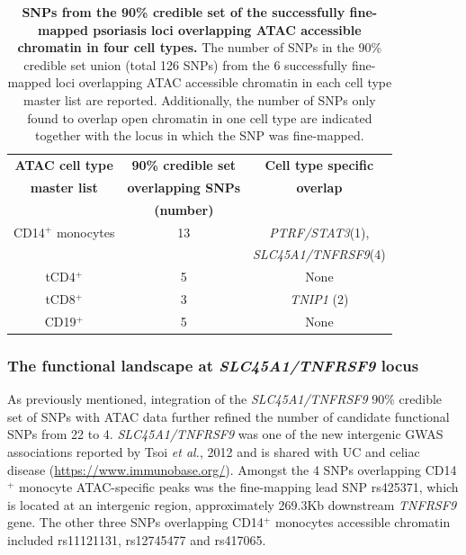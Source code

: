 \begin{table}[htbp]
\centering
\begin{tabular}{@{} c c c}
\toprule
\textbf{ATAC cell type} & \textbf{90\% credible set}   &  \textbf{Cell type specific}  \\
\textbf{master list}    & \textbf{overlapping SNPs}    &   \textbf{overlap}   \\
									      &	\textbf{(number)}				     &                            \\
\midrule
\midrule
 CD14$^+$ monocytes    & 13                            &  \textit{PTRF/STAT3}(1),\\ 
                       &                               &  \textit{SLC45A1/TNFRSF9}(4)\\
 tCD4$^+$              & 5                             &  None \\
 tCD8$^+$              & 3                             &  \textit{TNIP1} (2)        \\
 CD19$^+$              & 5                            &  None     \\
\bottomrule
\end{tabular}
\medskip %
\caption[SNPs from the 90\% credible set of the successfully fine-mapped psoriasis loci overlapping ATAC accessible chromatin in four cell types.]{\textbf{SNPs from the 90\% credible set of the successfully fine-mapped psoriasis loci overlapping ATAC accessible chromatin in four cell types.} The number of SNPs in the 90\% credible set union (total 126 SNPs) from the 6 successfully fine-mapped loci overlapping ATAC accessible chromatin in each cell type master list are reported. Additionally, the number of SNPs only found to overlap open chromatin in one cell type are indicated together with the locus in which the SNP was fine-mapped.}
\label{tab:Psoriasis_fine_mapping_ATAC_overlap}
\end{table}



\subsubsection{The functional landscape at \textit{SLC45A1/TNFRSF9} locus}

As previously mentioned, integration of the \textit{SLC45A1/TNFRSF9} 90\% credible set of SNPs with ATAC data further refined the number of candidate functional SNPs from 22 to 4. \textit{SLC45A1/TNFRSF9} was one of the new intergenic GWAS associations reported by Tsoi \textit{et al.}, 2012 and is shared with UC and celiac disease (\url{https://www.immunobase.org/}). Amongst the 4 SNPs overlapping CD14$^+$ monocyte ATAC-specific peaks was the fine-mapping lead SNP rs425371, which is located at an intergenic region, approximately 269.3Kb downstream \textit{TNFRSF9} gene. The other three SNPs overlapping CD14$^+$ monocytes accessible chromatin included rs11121131, rs12745477 and rs417065. 




